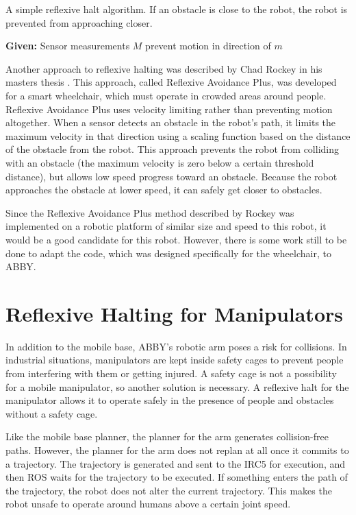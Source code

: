 \documentclass[]{cwru} %
\begin{document}
\begin{algorithm}
\caption{A simple reflexive halt
algorithm. If an obstacle is close to the robot, the robot is prevented
from approaching closer.}
\label{alg:reflexive-halt}
\begin{algorithmic}
\STATE \textbf{Given:} Sensor measurements $M$
    \STATE prevent motion in direction of $m$
  \ENDIF
\ENDFOR
\end{algorithmic}
\end{algorithm}

Another approach to reflexive halting was described by Chad Rockey in
his masters thesis \cite{rockey}. This approach, called Reflexive Avoidance
Plus, was developed for a smart wheelchair, which must operate in
crowded areas around people. Reflexive Avoidance Plus uses velocity
limiting rather than preventing motion altogether. When a sensor detects
an obstacle in the robot's path, it limits the maximum velocity in that
direction using a scaling function based on the distance of the obstacle
from the robot. This approach prevents the robot from colliding with an
obstacle (the maximum velocity is zero below a certain threshold
distance), but allows low speed progress toward an obstacle. Because the
robot approaches the obstacle at lower speed, it can safely get closer
to obstacles.

Since the Reflexive Avoidance Plus method described by Rockey was
implemented on a robotic platform of similar size and speed to this
robot, it would be a good candidate for this robot. However, there is
some work still to be done to adapt the code, which was designed
specifically for the wheelchair, to ABBY.

\section{Reflexive Halting for Manipulators}

In addition to the mobile base, ABBY's robotic arm poses a risk for
collisions. In industrial situations, manipulators are kept inside
safety cages to prevent people from interfering with them or getting
injured. A safety cage is not a possibility for a mobile manipulator, so
another solution is necessary. A reflexive halt for the manipulator
allows it to operate safely in the presence of people and obstacles
without a safety cage.

Like the mobile base planner, the planner for the arm generates
collision-free paths. However, the planner for the arm does not replan
at all once it commits to a trajectory. The trajectory is generated and
sent to the IRC5 for execution, and then ROS waits for the trajectory to
be executed. If something enters the path of the trajectory, the robot
does not alter the current trajectory. This makes the robot unsafe to
operate around humans above a certain joint speed.
\end{document}
